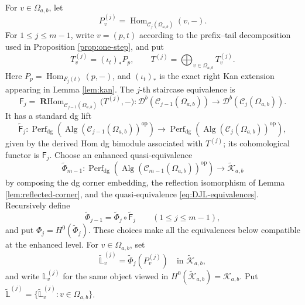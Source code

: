\documentclass[12pt,a4paper,english,reqno]{amsart}
\theoremstyle{plain}
\theoremstyle{definition}
\newcommand{\Hom}{\operatorname{Hom}}
\newcommand{\RHom}{\operatorname{\mathbf{R}Hom}}
\newcommand{\op}{\mathrm{op}}
\newcommand{\C}{\mathcal C}
\newcommand{\Db}[1]{{\mathscr D}^b(#1)}
\begin{document}
For $v\in\Omega_{a,b}$, let
\begin{equation}
 P_v^{(j)}
 =
 \Hom_{\C_j(\Omega_{a,b})}(v,-).
\label{eq:staircase-projective-j}
\end{equation}
For $1\leq j\leq m-1$, write $v=(p,t)$ according to the prefix--tail
decomposition used in Proposition \ref{prop:one-step}, and put
\begin{equation}
 T_v^{(j)}
 =
 (\iota_t)_*P_p,
 \qquad
 T^{(j)}
 =
 \bigoplus_{v\in\Omega_{a,b}}T_v^{(j)}.
\label{eq:staircase-tilting-j}
\end{equation}
Here $P_p=\Hom_{F_j(t)}(p,-)$, and $(\iota_t)_*$ is the exact right
Kan extension appearing in Lemma \ref{lem:kan}.  The $j$-th staircase
equivalence is
\begin{equation}
 \mathsf F_j
 =
 \RHom_{\C_{j-1}(\Omega_{a,b})}
 \bigl(T^{(j)},-\bigr)
 \colon
 \Db{\C_{j-1}(\Omega_{a,b})}
 \longrightarrow
 \Db{\C_j(\Omega_{a,b})}.
\label{eq:staircase-step-functor}
\end{equation}
It has a standard dg lift
\begin{equation}
 \widetilde{\mathsf F}_j\colon
 \operatorname{Perf}_{\mathrm{dg}}
 \!\left(\operatorname{Alg}(\C_{j-1}(\Omega_{a,b}))^{\op}\right)
 \longrightarrow
 \operatorname{Perf}_{\mathrm{dg}}
 \!\left(\operatorname{Alg}(\C_j(\Omega_{a,b}))^{\op}\right),
\label{eq:enhanced-staircase-step}
\end{equation}
given by the derived Hom dg bimodule associated with $T^{(j)}$; its
cohomological functor is $\mathsf F_j$.  Choose an enhanced
quasi-equivalence
\begin{equation}
 \widetilde\Phi_{m-1}\colon
 \operatorname{Perf}_{\mathrm{dg}}
 \!\left(\operatorname{Alg}(\C_{m-1}(\Omega_{a,b}))^{\op}\right)
 \longrightarrow\widetilde{\mathcal K}_{a,b}
\label{eq:enhanced-final-Phi}
\end{equation}
by composing the dg corner embedding, the reflection isomorphism of
Lemma \ref{lem:reflected-corner}, and the quasi-equivalence
\eqref{eq:DJL-equivalences}.  Recursively define
\begin{equation}
 \widetilde\Phi_{j-1}
 =\widetilde\Phi_j\circ\widetilde{\mathsf F}_j
 \qquad(1\leq j\leq m-1),
\label{eq:enhanced-Phi-recursion}
\end{equation}
and put $\Phi_j=H^0(\widetilde\Phi_j)$.  These choices make all the
equivalences below compatible at the enhanced level.
For $v\in\Omega_{a,b}$, set
\begin{equation}
 \widetilde{\mathbb L}_v^{(j)}
 =\widetilde\Phi_j(P_v^{(j)})
 \quad\text{in }\widetilde{\mathcal K}_{a,b},
\label{eq:enhanced-L-j-definition}
\end{equation}
and write $\mathbb L_v^{(j)}$ for the same object viewed in
$H^0(\widetilde{\mathcal K}_{a,b})=\mathcal K_{a,b}$.  Put
$\widetilde{\mathbb L}^{(j)}=
\{\widetilde{\mathbb L}_v^{(j)}:v\in\Omega_{a,b}\}$.
\end{document}
